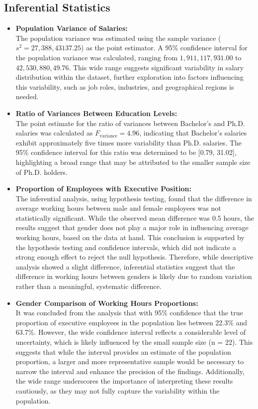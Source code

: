 \documentclass[12pt,a4paper]{article}
\begin{document}
\subsection{Inferential Statistics}

\vspace{1cm}
\begin{itemize}
    \item \textbf{Population Variance of Salaries:} \\
    The population variance was estimated using the sample variance (\(s^2 = 27,388,43137.25\)) as the point estimator. A 95\% confidence interval for the population variance was calculated, ranging from \(1,911,117,931.00\) to \(42,530,880,49.76\). This wide range suggests significant variability in salary distribution within the dataset, further exploration into factors influencing this variability, such as job roles, industries, and geographical regions is needed.

    \item \textbf{Ratio of Variances Between Education Levels:} \\
    The point estimate for the ratio of variances between Bachelor's and Ph.D. salaries was calculated as \(F_{\text{variance}} = 4.96\), indicating that Bachelor's salaries exhibit approximately five times more variability than Ph.D. salaries. The 95\% confidence interval for this ratio was determined to be [0.79, 31.02], highlighting a broad range that may be attributed to the smaller sample size of Ph.D. holders.
    \item \textbf{Proportion of Employees with Executive Position:} \\
The inferential analysis, using hypothesis testing, found that the difference in average working hours between male and female employees was not statistically significant. While the observed mean difference was 0.5 hours, the results suggest that gender does not play a major role in influencing average working hours, based on the data at hand. This conclusion is supported by the hypothesis testing and confidence intervals, which did not indicate a strong enough effect to reject the null hypothesis. Therefore, while descriptive analysis showed a slight difference, inferential statistics suggest that the difference in working hours between genders is likely due to random variation rather than a meaningful, systematic difference.

    \item \textbf{Gender Comparison of Working Hours Proportions:} \\
It was concluded from the analysis that with 95\% confidence that the true proportion of executive employees in the population lies between 22.3\% and 63.7\%. However, the wide confidence interval reflects a considerable level of uncertainty, which is likely influenced by the small sample size (n = 22). This suggests that while the interval provides an estimate of the population proportion, a larger and more representative sample would be necessary to narrow the interval and enhance the precision of the findings. Additionally, the wide range underscores the importance of interpreting these results cautiously, as they may not fully capture the variability within the population.


\end{itemize}
\end{document}
